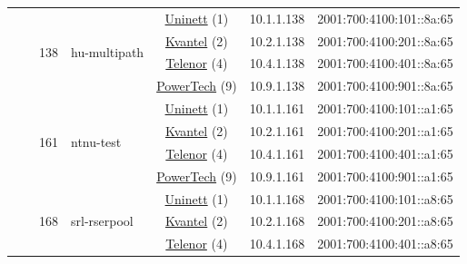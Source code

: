 \begin{small}
\begin{center}
\begin{longtable}{|c|c|c|c|c|c|c|c|}
  &  & \multirow{4}{*}{\tiny{138}} & \multicolumn{1}{|l|}{\multirow{4}{*}{\tiny{hu-multipath}}} & \multicolumn{2}{|c|}{\tiny{\href{https://www.uninett.no}{Uninett} (1)}} & \tiny{10.1.1.138} & \tiny{2001:700:4100:101::8a:65} \\* \cline{5-5}\cline{6-6}\cline{7-7}\cline{8-8}
  &  &  &  & \multicolumn{2}{|c|}{\tiny{\href{http://kvantel.no}{Kvantel} (2)}} & \tiny{10.2.1.138} & \tiny{2001:700:4100:201::8a:65} \\* \cline{5-5}\cline{6-6}\cline{7-7}\cline{8-8}
  &  &  &  & \multicolumn{2}{|c|}{\tiny{\href{https://www.telenor.no}{Telenor} (4)}} & \tiny{10.4.1.138} & \tiny{2001:700:4100:401::8a:65} \\* \cline{5-5}\cline{6-6}\cline{7-7}\cline{8-8}
  &  &  &  & \multicolumn{2}{|c|}{\tiny{\href{http://www.powertech.no}{PowerTech} (9)}} & \tiny{10.9.1.138} & \tiny{2001:700:4100:901::8a:65} \\* \cline{3-3}\cline{4-4}\cline{5-5}\cline{6-6}\cline{7-7}\cline{8-8}
  &  & \multirow{4}{*}{\tiny{161}} & \multicolumn{1}{|l|}{\multirow{4}{*}{\tiny{ntnu-test}}} & \multicolumn{2}{|c|}{\tiny{\href{https://www.uninett.no}{Uninett} (1)}} & \tiny{10.1.1.161} & \tiny{2001:700:4100:101::a1:65} \\* \cline{5-5}\cline{6-6}\cline{7-7}\cline{8-8}
  &  &  &  & \multicolumn{2}{|c|}{\tiny{\href{http://kvantel.no}{Kvantel} (2)}} & \tiny{10.2.1.161} & \tiny{2001:700:4100:201::a1:65} \\* \cline{5-5}\cline{6-6}\cline{7-7}\cline{8-8}
  &  &  &  & \multicolumn{2}{|c|}{\tiny{\href{https://www.telenor.no}{Telenor} (4)}} & \tiny{10.4.1.161} & \tiny{2001:700:4100:401::a1:65} \\* \cline{5-5}\cline{6-6}\cline{7-7}\cline{8-8}
  &  &  &  & \multicolumn{2}{|c|}{\tiny{\href{http://www.powertech.no}{PowerTech} (9)}} & \tiny{10.9.1.161} & \tiny{2001:700:4100:901::a1:65} \\* \cline{3-3}\cline{4-4}\cline{5-5}\cline{6-6}\cline{7-7}\cline{8-8}
  &  & \multirow{4}{*}{\tiny{168}} & \multicolumn{1}{|l|}{\multirow{4}{*}{\tiny{srl-rserpool}}} & \multicolumn{2}{|c|}{\tiny{\href{https://www.uninett.no}{Uninett} (1)}} & \tiny{10.1.1.168} & \tiny{2001:700:4100:101::a8:65} \\* \cline{5-5}\cline{6-6}\cline{7-7}\cline{8-8}
  &  &  &  & \multicolumn{2}{|c|}{\tiny{\href{http://kvantel.no}{Kvantel} (2)}} & \tiny{10.2.1.168} & \tiny{2001:700:4100:201::a8:65} \\* \cline{5-5}\cline{6-6}\cline{7-7}\cline{8-8}
  &  &  &  & \multicolumn{2}{|c|}{\tiny{\href{https://www.telenor.no}{Telenor} (4)}} & \tiny{10.4.1.168} & \tiny{2001:700:4100:401::a8:65} \\* \cline{5-5}\cline{6-6}\cline{7-7}\cline{8-8}

\end{longtable}
\end{center}
\end{small}
